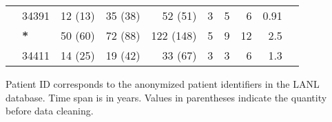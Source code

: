 \documentclass[12pt]{article}
\newcommand{\badpat}{\gdef\currentrowstyle{\bfseries}\bfseries\ignorespaces }
\begin{document}
\begin{table*}
{\begin{center}
\begin{tabular}{llrrrrrrrr}
\cite{Novitsky09}%
& 34391 & 12 (13) & 35 (38) & 52 (51) & 3 & 5 & 6 & 0.91 \\
& \badpat 34399* & 50 (60) & 72 (88) & 122 (148) & 5 & 9 & 12 & 2.5 \\
& 34411 & 14 (25) & 19 (42) & 33 (67) & 3 & 3 & 6 & 1.3 \\
\hline
\end{tabular}
\end{center}
}
	Patient ID corresponds to the anonymized patient identifiers in the LANL database.
	Time span is in years.
	Values in parentheses indicate the quantity before data cleaning.
\end{table*}

\pagebreak{}
\end{document}
